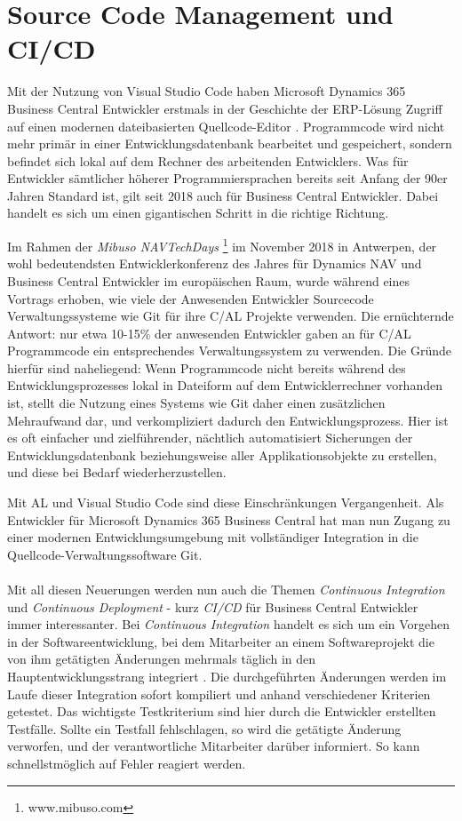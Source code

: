 \section{Source Code Management und CI/CD}
Mit der Nutzung von Visual Studio Code haben Microsoft Dynamics 365 Business Central Entwickler erstmals in der Geschichte der ERP-Lösung Zugriff auf einen modernen dateibasierten Quellcode-Editor \cite{freddysblog}. Programmcode wird nicht mehr primär in einer Entwicklungsdatenbank bearbeitet und gespeichert, sondern befindet sich lokal auf dem Rechner des arbeitenden Entwicklers. Was für Entwickler sämtlicher höherer Programmiersprachen bereits seit Anfang der 90er Jahren Standard ist, gilt seit 2018 auch für Business Central Entwickler. Dabei handelt es sich um einen gigantischen Schritt in die richtige Richtung. 

Im Rahmen der \textit{Mibuso NAVTechDays} \footnote{www.mibuso.com} im November 2018 in Antwerpen, der wohl bedeutendsten Entwicklerkonferenz des Jahres für Dynamics NAV und Business Central Entwickler im europäischen Raum, wurde während eines Vortrags erhoben, wie viele der Anwesenden Entwickler Sourcecode Verwaltungssysteme wie Git für ihre C/AL Projekte verwenden. Die ernüchternde Antwort: nur etwa 10-15\% der anwesenden Entwickler gaben an für C/AL Programmcode ein entsprechendes Verwaltungssystem zu verwenden. Die Gründe hierfür sind naheliegend: Wenn Programmcode nicht bereits während des Entwicklungsprozesses lokal in Dateiform auf dem Entwicklerrechner vorhanden ist, stellt die Nutzung eines Systems wie Git daher einen zusätzlichen Mehraufwand dar, und verkompliziert dadurch den Entwicklungsprozess. Hier ist es oft einfacher und zielführender, nächtlich automatisiert Sicherungen der Entwicklungsdatenbank beziehungsweise aller Applikationsobjekte zu erstellen, und diese bei Bedarf wiederherzustellen.

Mit AL und Visual Studio Code sind diese Einschränkungen Vergangenheit. Als Entwickler für Microsoft Dynamics 365 Business Central hat man nun Zugang zu einer modernen Entwicklungsumgebung mit vollständiger Integration in die Quellcode-Verwaltungssoftware Git. 

\paragraph{}
Mit all diesen Neuerungen werden nun auch die Themen \textit{Continuous Integration} und \textit{Continuous Deployment} - kurz \textit{CI/CD} für Business Central Entwickler immer interessanter. Bei \textit{Continuous Integration} handelt es sich um ein Vorgehen in der Softwareentwicklung, bei dem Mitarbeiter an einem Softwareprojekt die von ihm getätigten Änderungen mehrmals täglich in den Hauptentwicklungsstrang integriert \cite{fowler2006continuous}. Die durchgeführten Änderungen werden im Laufe dieser Integration sofort kompiliert und anhand verschiedener Kriterien getestet. Das wichtigste Testkriterium sind hier durch die Entwickler erstellten Testfälle. Sollte ein Testfall fehlschlagen, so wird die getätigte Änderung verworfen, und der verantwortliche Mitarbeiter darüber informiert. So kann schnellstmöglich auf Fehler reagiert werden. 
 
